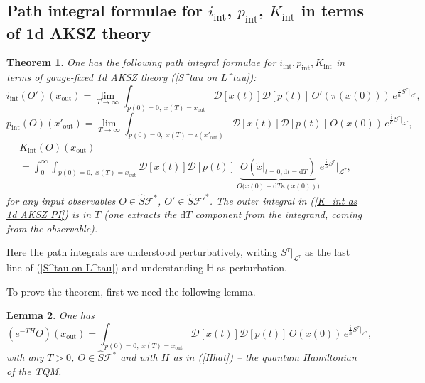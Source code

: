 \documentclass{amsart}
\theoremstyle{plain} %
\newtheorem{thm}{Theorem}[section]
\newtheorem{lem}[thm]{Lemma}
\theoremstyle{definition}
\theoremstyle{remark}
\newcommand{\mc}{\mathcal}
\newcommand{\mr}{\mathrm}
\newcommand{\ra}{\rightarrow}
\newcommand{\wh}{\widehat}
\newcommand{\til}{\widetilde}
\newcommand{\F}{\mathcal{F}}
\newcommand{\LL}{\mathcal{L}}
\newcommand{\ii}{\mathrm{int}}
\newcommand{\iii}{\mathrm{i}}
\newcommand{\dr}{\mathrm{d}}
\begin{document}
\subsection{Path integral formulae for $i_\ii$, $p_\ii$, $K_\ii$ in terms of 1d AKSZ theory}

\begin{thm}\label{thm: i_int,p_int,K_int from 1d AKSZ}
One has the following path integral formulae for $i_\ii,p_\ii,K_\ii$ in terms of gauge-fixed 1d AKSZ theory (\ref{S^tau on L^tau}):
\begin{equation}\label{i_int as 1d AKSZ PI}
    i_\ii(O')(x_\mr{out})=\lim_{T\ra \infty} \int_{p(0)=0,\; x(T)=x_\mr{out}} \mc{D} [x(t)] \mc{D} [p(t)]\, O'(\pi(x(0))) \, e^{\frac{\iii}{\hbar}S^\tau|_{\LL^\tau}},
\end{equation}
\begin{equation}\label{p_int as 1d AKSZ PI}
    p_\ii(O)(x'_\mr{out})=\lim_{T\ra \infty} \int_{p(0)=0,\; x(T)=\iota(x'_\mr{out})} \mc{D} [x(t)] \mc{D} [p(t)]\, O(x(0)) \, e^{\frac{\iii}{\hbar}S^\tau|_{\LL^\tau}},
\end{equation}
\begin{multline}\label{K_int as 1d AKSZ PI}
    K_\ii(O)(x_\mr{out})\\
    =\int_0^\infty \int_{p(0)=0,\; x(T)=x_\mr{out}} 
    \mc{D} [x(t)] \mc{D} [p(t)]\,
   \underbrace{O(\til{x}|_{t=0, \dr t=\dr T})}_{O\big(x(0)+\dr T\kappa(x(0))\big)} e^{\frac{\iii}{\hbar} S^\tau
   }%
   \Big|_{\LL^\tau},
\end{multline}
for any input observables $O\in \wh{S}\F^*$, $O'\in \wh{S}\F'^*$. %
The outer integral in (\ref{K_int as 1d AKSZ PI}) is in $T$ (one extracts the $\dr T$ component from the integrand, coming from the observable).
\end{thm}
Here the path integrals are understood perturbatively, writing $S^\tau|_{\LL^\tau}$ as the last line of (\ref{S^tau on L^tau}) and understanding $\mathbb{H}$ as perturbation.

To prove the theorem, first we need the following lemma.

\begin{lem}\label{lemma 5.20}
One has
    \begin{equation}\label{e^(-TH)) = 1d AKSZ PI}
    (e^{-TH}O)(x_\mr{out})=
           \int_{p(0)=0,\; x(T)=x_\mr{out}} \mc{D} [x(t)] \mc{D} [p(t)]\, O(x(0)) \, e^{\frac{\iii}{\hbar}S^\tau|_{\LL^\tau}},
    \end{equation}
    with any $T>0$, $O\in \wh{S}\F^*$ and with $H$ as in (\ref{Hhat}) -- the quantum Hamiltonian of the TQM.
\end{lem}
\end{document}
